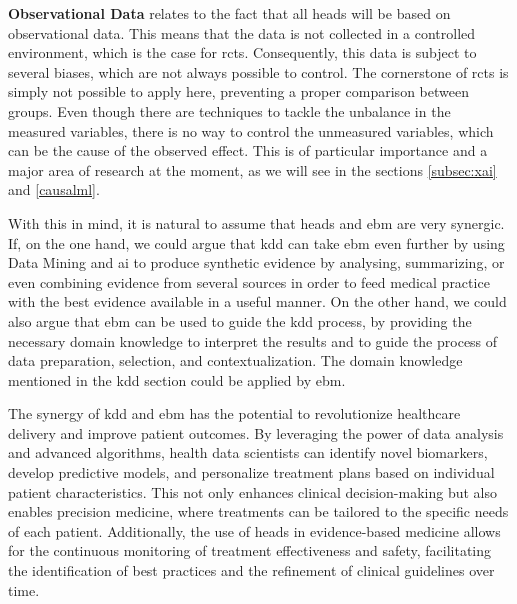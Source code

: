 \textbf{Observational Data} relates to the fact that all \ac{heads} will be based on observational data. This means that the data is not collected in a controlled environment, which is the case for \acp{rct}. Consequently, this data is subject to several biases, which are not always possible to control. The cornerstone of \acp{rct} is simply not possible to apply here, preventing a proper comparison between groups. Even though there are techniques to tackle the unbalance in the measured variables, there is no way to control the unmeasured variables, which can be the cause of the observed effect. This is of particular importance and a major area of research at the moment, as we will see in the sections \ref{subsec:xai} and \ref{causalml}.

With this in mind, it is natural to assume that \ac{heads} and \ac{ebm} are very synergic. If, on the one hand, we could argue that \ac{kdd} can take \ac{ebm} even further by using Data Mining and \ac{ai} to produce synthetic evidence by analysing, summarizing, or even combining evidence from several sources in order to feed medical practice with the best evidence available in a useful manner. On the other hand, we could also argue that \ac{ebm} can be used to guide the \ac{kdd} process, by providing the necessary domain knowledge to interpret the results and to guide the process of data preparation, selection, and contextualization. The domain knowledge mentioned in the \ac{kdd} section could be applied by \ac{ebm}.

The synergy of \ac{kdd} and \ac{ebm} has the potential to revolutionize healthcare delivery and improve patient outcomes. By leveraging the power of data analysis and advanced algorithms, health data scientists can identify novel biomarkers, develop predictive models, and personalize treatment plans based on individual patient characteristics. This not only enhances clinical decision-making but also enables precision medicine, where treatments can be tailored to the specific needs of each patient. Additionally, the use of \ac{heads} in evidence-based medicine allows for the continuous monitoring of treatment effectiveness and safety, facilitating the identification of best practices and the refinement of clinical guidelines over time.
